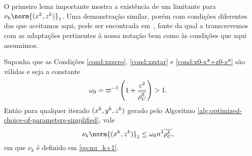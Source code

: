 
O primeiro lema importante mostra a existência de um limitante para $\nu_k\norm{(\xk,\zk)}_{1}$. Uma demonstração similar, porém com condições diferentes das que aceitamos aqui, pode ser encontrada em~\cite[Lema 6.1]{Wright:Primal-dual-interior-point:1997h}, fonte da qual a transcrevemos com as adaptações pertinentes à nossa notação bem como às condições que aqui assumimos.




\begin{lema}\label{lemma:boundxz1}
	Suponha que as Condições \ref{cond:xzzero}, \ref{cond:xzstar} e \ref{cond:x0-x*+z0-z*} são válidas e seja a constante 
	\begin{equation}\label{eq:omega-0}
		\omega_{0} = \varpi^{-1}\left(1  + \dfrac{\varsigma^{2}}{\overline{\rho_C^{0}}}\right) >1.
		\end{equation} 
	 Então para qualquer iterado $(x^{k},y^{k},z^{k})$ gerado pelo Algoritmo \ref{alg:optimized-choice-of-parameters-simplified}, vale
	\begin{equation}
		\label{eq:bound-xkzk}
		\nu_k\norm{(\xk,\zk)}_{1} \leq  \omega_{0} n^{3} \dbvec{\rho_C^{k}},
	\end{equation}
	em que $\nu_k$ é definido em \eqref{eq:nu_k+1}.
\end{lema}

